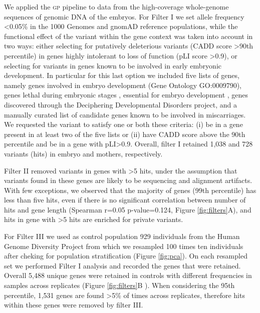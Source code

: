 \documentclass[fleqn,10pt]{wlscirep}
\newcommand{\gp}[]{\textsc{gp }}
\begin{document}
We applied the \gp pipeline to data from the high-coverage whole-genome sequences of genomic DNA of the embryos. For Filter I we set allele frequency <0.05\% in the 1000 Genomes\cite{1000genome2015global} and gnomAD\cite{karczewski2020mutational} reference populations, while the functional effect of the variant within the gene context was taken into account in two ways: either selecting for putatively deleterious variants (CADD score >90th percentile) in genes highly intolerant to loss of function (pLI score >0.9), or selecting for variants in genes known to be involved in early embryonic development. In particular for this last option we included five lists of genes, namely genes involved in embryo development (Gene Ontology GO:0009790), genes lethal during embryonic stages \cite{dawes2019gene}, essential for embryo development \cite{dawes2019gene}, genes discovered through the Deciphering Developmental Disorders project\cite{study2015large}, and a manually curated list of candidate genes known to be involved in miscarriages. We requested the variant to satisfy one or both these criteria: (i) be in a gene present in at least two of the five lists or (ii) have CADD score above the 90th percentile and be in a gene with pLI>0.9. Overall, filter I retained 1,038 and 728 variants (hits) in embryo and mothers, respectively.   

Filter II removed variants in genes with >5 hits, under the assumption that variants found in these genes are likely to be sequencing and alignment artifacts. With few exceptions, we observed that the majority of genes (99th percentile) has less than five hits, even if there is no significant correlation between number of hits and gene length (Spearman r=0.05 p-value=0.124, Figure \ref{fig:filters}A), and hits in gene with >5 hits are enriched for private variants.  

For Filter III we used as control population 929 individuals from the Human Genome Diversity Project\cite{bergstrom2020insights} from which we resampled 100 times ten individuals after cheking for population stratification (Figure \ref{fig:pca}). On each resampled set we performed Filter I analysis and recorded the genes that were retained. Overall 5,488 unique genes were retained in controls with different frequencies in samples across replicates (Figure \ref{fig:filters}B ). When considering the 95th percentile, 1,531 genes are found >5\% of times across replicates, therefore hits within these genes were removed by filter III. %
\end{document}
